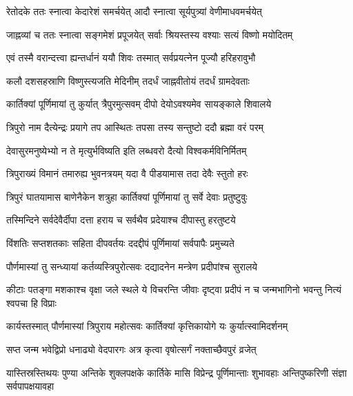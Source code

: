 \twolineshloka
{रेतोदके ततः स्नात्वा केदारेशं समर्चयेत्}
{आदौ स्नात्वा सूर्यपुत्र्यां वेणीमाधवमर्चयेत्} %

\twolineshloka
{जाह्नव्यां च ततः स्नात्वा सङ्गमेशं प्रपूजयेत्}
{सर्वाः श्रियस्तस्य वश्याः सत्यं विष्णो मयोदितम्} %

\twolineshloka
{एवं तस्मै वरान्दत्त्वा ह्यन्तर्धानं ययौ शिवः}
{तस्मात् सर्वप्रयत्नेन पूज्यौ हरिहरावुभौ} %

\twolineshloka
{कलौ दशसहस्राणि विष्णुस्त्यजति मेदिनीम्}
{तदर्धं जाह्नवीतोयं तदर्धं ग्रामदेवताः} %

\twolineshloka
{कार्तिक्यां पूर्णिमायां तु कुर्यात् त्रैपुरमुत्सवम्}
{दीपो देयोऽवश्यमेव सायङ्काले शिवालये} %

\twolineshloka
{त्रिपुरो नाम दैत्येन्द्रः प्रयागे तप आस्थितः}
{तपसा तस्य सन्तुष्टो ददौ ब्रह्मा वरं परम्} %

\twolineshloka
{देवासुरमनुष्येभ्यो न ते मृत्युर्भविष्यति}
{इति लब्धवरो दैत्यो विश्वकर्मविनिर्मितम्} %

\twolineshloka
{त्रिपुराख्यं विमानं तमारुह्य भुवनत्रयम्}
{यदा वै पीडयामास तदा देवैः स्तुतो हरः} %

\twolineshloka
{त्रिपुरं घातयामास बाणेनैकेन शत्रुहा}
{कार्तिक्यां पूर्णिमायां तु सर्वे देवाः प्रतुष्टुवुः} %

\twolineshloka
{तस्मिन्दिने सर्वदेवैर्दीपा दत्ता हराय च}
{सर्वथैव प्रदेयाश्च दीपास्तु हरतुष्टये} %

\twolineshloka
{विंशतिः सप्तशतकाः सहिता दीपवर्तयः}
{ददद्दीपं पूर्णिमायां सर्वपापैः प्रमुच्यते} %

\twolineshloka
{पौर्णमास्यां तु सन्ध्यायां कर्तव्यस्त्रिपुरोत्सवः}
{दद्यादनेन मन्त्रेण प्रदीपांश्च सुरालये} %

\fourlineindentedshloka
{कीटाः पतङ्गा मशकाश्च वृक्षा}
{जले स्थले ये विचरन्ति जीवाः}
{दृष्ट्वा प्रदीपं न च जन्मभागिनो}
{भवन्तु नित्यं श्वपचा हि विप्राः} %

\twolineshloka
{कार्यस्तस्मात् पौर्णमास्यां त्रिपुराय महोत्सवः}
{कार्तिक्यां कृत्तिकायोगे यः कुर्यात्स्वामिदर्शनम्} %

\twolineshloka
{सप्त जन्म भवेद्विप्रो धनाढ्यो वेदपारगः}
{अत्र कृत्वा वृषोत्सर्गं नक्ताच्छैवपुरं व्रजेत्} %




\threelineshloka
{यास्तिस्रस्तिथयः पुण्या अन्तिके शुक्लपक्षके}
{कार्तिके मासि विप्रेन्द्र पूर्णिमान्ताः शुभावहाः} %
{अन्तिपुष्करिणी संज्ञा सर्वपापक्षयावहा}

